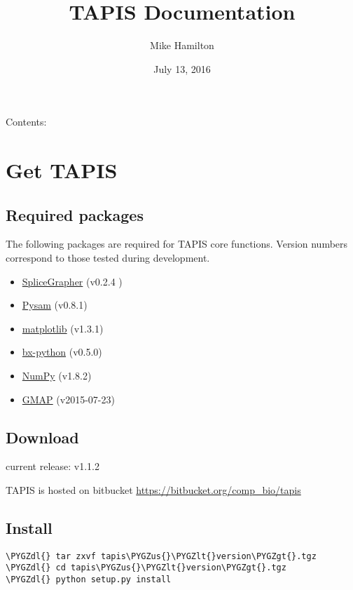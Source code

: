\documentclass[letterpaper,10pt,english]{sphinxmanual}
\title{TAPIS Documentation}
\date{July 13, 2016}
\author{Mike Hamilton}
\def\PYGZus{\char`\_}
\def\PYGZlt{\char`\<}
\def\PYGZgt{\char`\>}
\def\PYGZdl{\char`\$}
\begin{document}
\maketitle
\tableofcontents
{}\label{index::doc}


Contents:


\chapter{Get TAPIS}
\label{installation:welcome-to-tapis-s-documentation}\label{installation::doc}\label{installation:get-tapis}

\section{Required packages}
\label{installation:required-packages}
The following packages are required for TAPIS core functions.
Version numbers correspond to those tested during development.
\begin{itemize}
\item {} 
\href{http://splicegrapher.sourceforge.net/}{SpliceGrapher} (v0.2.4 )

\item {} 
\href{https://code.google.com/p/pysam/}{Pysam} (v0.8.1)

\item {} 
\href{http://matplotlib.org/}{matplotlib} (v1.3.1)

\item {} 
\href{https://pypi.python.org/pypi/bx-python/0.7.3}{bx-python} (v0.5.0)

\item {} 
\href{http://www.numpy.org/}{NumPy} (v1.8.2)

\item {} 
\href{http://research-pub.gene.com/gmap/}{GMAP} (v2015-07-23)

\end{itemize}


\section{Download}
\label{installation:download}
current release: v1.1.2

TAPIS is hosted on bitbucket \href{https://bitbucket.org/comp\_bio/tapis}{https://bitbucket.org/comp\_bio/tapis}


\section{Install}
\label{installation:install}
\begin{Verbatim}[commandchars=\\\{\}]
\PYGZdl{} tar zxvf tapis\PYGZus{}\PYGZlt{}version\PYGZgt{}.tgz
\PYGZdl{} cd tapis\PYGZus{}\PYGZlt{}version\PYGZgt{}.tgz
\PYGZdl{} python setup.py install
\end{Verbatim}
\end{document}
